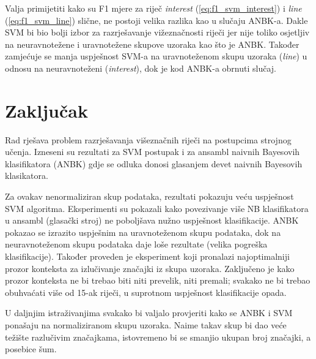 \documentclass[10pt, a4paper]{article}
\begin{document}
Valja primijetiti kako su F1 mjere za riječ \emph{interest} (\ref{eq:f1_svm_interest}) i \emph{line} 
(\ref{eq:f1_svm_line}) slične, ne postoji velika razlika kao u slučaju ANBK-a.
Dakle SVM bi bio bolji izbor za razrješavanje vižeznačnosti riječi jer
nije toliko osjetljiv na neuravnotežene i uravnotežene skupove uzoraka
kao što je ANBK.
Također zamjećuje se manja uspješnost SVM-a na uravnoteženom
skupu uzoraka (\emph{line}) u odnosu na neuravnoteženi (\emph{interest}), 
dok je kod ANBK-a obrnuti slučaj.

\section{Zaključak}
Rad rješava problem razrješavanja višeznačnih riječi na postupcima
strojnog učenja. Izneseni su rezultati za SVM postupak i za
ansambl naivnih Bayesovih klasifikatora (ANBK) gdje se odluka donosi
glasanjem devet naivnih Bayesovih klasikatora.

Za ovakav nenormaliziran skup podataka, rezultati pokazuju
veću uspješnost SVM algoritma. Eksperimenti su pokazali kako povezivanje više 
NB klasifikatora u ansambl (glasački stroj) ne poboljšava nužno uspješnost klasifikacije.
ANBK pokazao se
izrazito uspješnim na uravnoteženom skupu podataka, dok
na neuravnoteženom skupu podataka daje loše rezultate (velika
pogreška klasifikacije).
Također proveden je eksperiment
koji pronalazi najoptimalniji prozor konteksta za izlučivanje
značajki iz skupa uzoraka. Zaključeno je kako prozor konteksta ne bi trebao
biti niti prevelik, niti premali; svakako ne bi trebao obuhvaćati više od 15-ak riječi, 
u suprotnom uspješnost klasifikacije opada.

U daljnjim istraživanjima svakako bi valjalo provjeriti kako se ANBK i SVM ponašaju na
normaliziranom skupu uzoraka. Naime takav skup bi dao veće težište razlučivim značajkama,
istovremeno bi se smanjio ukupan broj značajki, a posebice šum.


 
\end{document}

